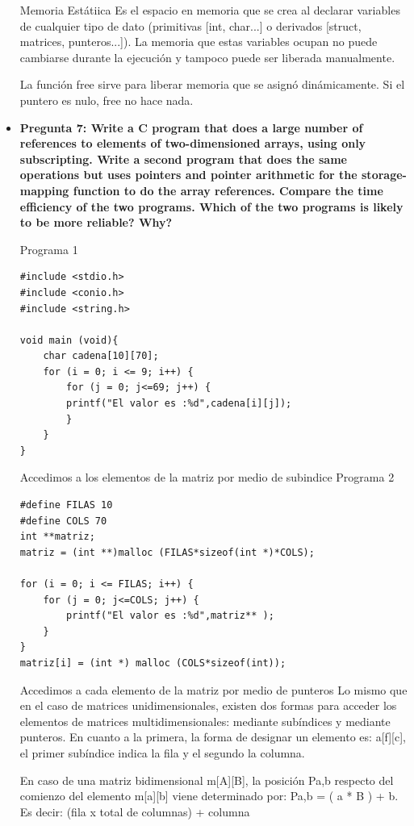 \documentclass[12pt,oneside]{article}
\begin{document}
\begin{itemize}
Memoria Estátiica
Es el espacio en memoria que se crea al declarar variables de cualquier tipo de dato (primitivas [int, char...] o derivados [struct, matrices, punteros...]). La memoria que estas variables ocupan no puede cambiarse durante la ejecución y tampoco puede ser liberada manualmente.

La función free sirve para liberar memoria que se asignó dinámicamente. Si el puntero es nulo, free no hace nada.


					
				\item {\bf Pregunta 7: Write a C program that does a large number of references to elements
of two-dimensioned arrays, using only subscripting. Write a second
program that does the same operations but uses pointers and pointer
arithmetic for the storage-mapping function to do the array references.
Compare the time efficiency of the two programs. Which of the two
programs is likely to be more reliable? Why?}

Programa 1
\begin{lstlisting}[frame = single] 
#include <stdio.h>
#include <conio.h>
#include <string.h>

void main (void){
	char cadena[10][70];
	for (i = 0; i <= 9; i++) {
		for (j = 0; j<=69; j++) {
		printf("El valor es :%d",cadena[i][j]);
		}			
	}
}
\end{lstlisting}
Accedimos a los elementos de la matriz por medio de subindice 
							Programa 2
							\begin{lstlisting}[frame = single] 
#define FILAS 10
#define COLS 70
int **matriz;
matriz = (int **)malloc (FILAS*sizeof(int *)*COLS);
 
for (i = 0; i <= FILAS; i++) {
	for (j = 0; j<=COLS; j++) {
		printf("El valor es :%d",matriz** );
	}					
}
matriz[i] = (int *) malloc (COLS*sizeof(int));

							\end{lstlisting}


Accedimos a cada elemento de la matriz por medio de punteros 
Lo mismo que en el caso de matrices unidimensionales, existen dos formas para acceder los elementos de matrices multidimensionales: mediante subíndices y mediante punteros. En cuanto a la primera, la forma de designar un elemento es: a[f][c], el primer subíndice indica la fila y el segundo la columna.

En caso de una matriz bidimensional m[A][B], la posición Pa,b respecto del comienzo del elemento m[a][b] viene determinado por: Pa,b = ( a * B ) + b. Es decir: (fila x total de columnas) + columna
					
\end{itemize}
\end{document}
